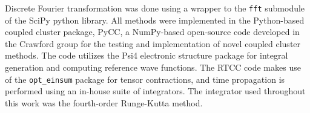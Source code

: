Discrete Fourier transformation was done using a wrapper to the \texttt{fft} submodule
of the SciPy python library.\cite{scipy} 
All methods were implemented in the Python-based coupled
cluster package, PyCC\cite{pycc}, a NumPy-based\cite{numpy} open-source code developed 
in the Crawford group for the testing and implementation of novel coupled cluster methods. 
The code utilizes the Psi4 electronic
structure package\cite{Smith2020} for integral generation and computing reference 
wave functions. 
The RTCC code makes use of the \texttt{opt\_einsum} package\cite{opteinsum} for tensor contractions,
and time propagation is performed using an in-house suite of integrators. The integrator
used throughout this work was the fourth-order Runge-Kutta method.\cite{rk}

